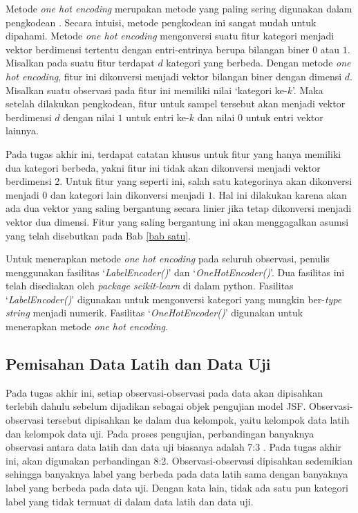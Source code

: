 \noindent Metode \emph{one hot encoding} merupakan metode yang paling sering digunakan dalam pengkodean \cite{kedarpotdar}. Secara intuisi, metode pengkodean ini sangat mudah untuk dipahami. Metode \emph{one hot encoding} mengonversi suatu fitur kategori menjadi vektor berdimensi tertentu dengan entri-entrinya berupa bilangan biner $0$ atau $1$. Misalkan pada suatu fitur terdapat $d$ kategori yang berbeda. Dengan metode \emph{one hot encoding}, fitur ini dikonversi menjadi vektor bilangan biner dengan dimensi $d$. Misalkan suatu observasi pada fitur ini memiliki nilai `kategori ke-$k$'. Maka setelah dilakukan pengkodean, fitur untuk sampel tersebut akan menjadi vektor berdimensi $d$ dengan nilai $1$ untuk entri ke-$k$ dan nilai $0$ untuk entri vektor lainnya.

\noindent Pada tugas akhir ini, terdapat catatan khusus untuk fitur yang hanya memiliki dua kategori berbeda, yakni fitur ini tidak akan dikonversi menjadi vektor berdimensi 2. Untuk fitur yang seperti ini, salah satu kategorinya akan dikonversi menjadi $0$ dan kategori lain dikonversi menjadi $1$. Hal ini dilakukan karena akan ada dua vektor yang saling bergantung secara linier jika tetap dikonversi menjadi vektor dua dimensi. Fitur yang saling bergantung ini akan menggagalkan asumsi yang telah disebutkan pada Bab \ref{bab satu}.

\noindent Untuk menerapkan metode \emph{one hot encoding} pada seluruh observasi, penulis menggunakan fasilitas `\emph{LabelEncoder()}' dan `\emph{OneHotEncoder()}'. Dua fasilitas ini telah disediakan oleh \emph{package scikit-learn} di dalam python. Fasilitas `\emph{LabelEncoder()}' digunakan untuk mengonversi kategori yang mungkin ber-\emph{type string} menjadi numerik. Fasilitas  `\emph{OneHotEncoder()}' digunakan untuk menerapkan metode \emph{one hot encoding}.

\subsection{Pemisahan Data Latih dan Data Uji}
\noindent Pada tugas akhir ini, setiap observasi-observasi pada data akan dipisahkan terlebih dahulu sebelum dijadikan sebagai objek pengujian model JSF. Observasi-observasi tersebut dipisahkan ke dalam dua kelompok, yaitu kelompok data latih dan kelompok data uji. Pada proses pengujian, perbandingan banyaknya observasi antara data latih dan data uji biasanya adalah 7:3 \cite{liu}. Pada tugas akhir ini, akan digunakan perbandingan 8:2. Observasi-observasi dipisahkan sedemikian sehingga banyaknya label yang berbeda pada data latih sama dengan banyaknya label yang berbeda pada data uji. Dengan kata lain, tidak ada satu pun kategori label yang tidak termuat di dalam data latih dan data uji.

